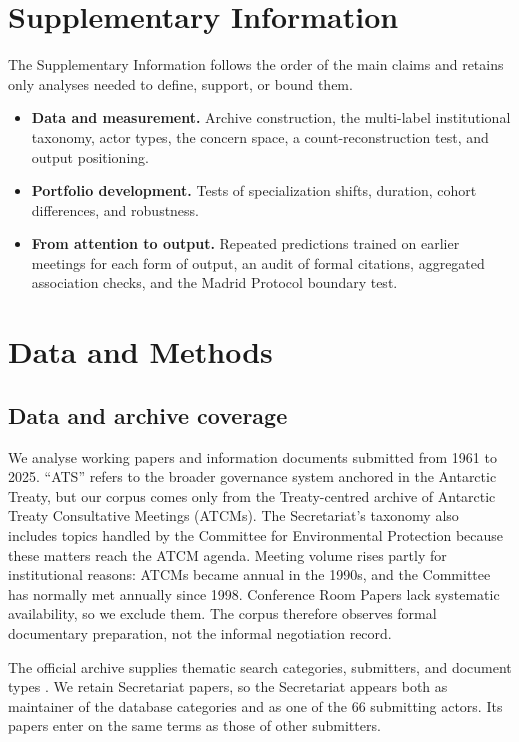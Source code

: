 \documentclass{fun_article}
\begin{document}
\printbibliography
\clearpage
\appendix
\setcounter{figure}{0}
\setcounter{table}{0}
\renewcommand{\thefigure}{S\arabic{figure}}
\renewcommand{\thetable}{S\arabic{table}}
\section*{Supplementary Information}

The Supplementary Information follows the order of the main claims and retains only analyses needed to define, support, or bound them.

\begin{itemize}
 \item \textbf{Data and measurement.} Archive construction, the multi-label institutional taxonomy, actor types, the concern space, a count-reconstruction test, and output positioning.
 \item \textbf{Portfolio development.} Tests of specialization shifts, duration, cohort differences, and robustness.
 \item \textbf{From attention to output.} Repeated predictions trained on earlier meetings for each form of output, an audit of formal citations, aggregated association checks, and the Madrid Protocol boundary test.
\end{itemize}

\section{Data and Methods}
\subsection{Data and archive coverage}
We analyse working papers and information documents submitted from 1961 to 2025. ``ATS'' refers to the broader governance system anchored in the Antarctic Treaty, but our corpus comes only from the Treaty-centred archive of Antarctic Treaty Consultative Meetings (ATCMs). The Secretariat's taxonomy also includes topics handled by the Committee for Environmental Protection because these matters reach the ATCM agenda. Meeting volume rises partly for institutional reasons: ATCMs became annual in the 1990s, and the Committee has normally met annually since 1998. Conference Room Papers lack systematic availability, so we exclude them. The corpus therefore observes formal documentary preparation, not the informal negotiation record.

The official archive supplies thematic search categories, submitters, and document types \cite{Yaryab2024}. We retain Secretariat papers, so the Secretariat appears both as maintainer of the database categories and as one of the 66 submitting actors. Its papers enter on the same terms as those of other submitters.
\end{document}
